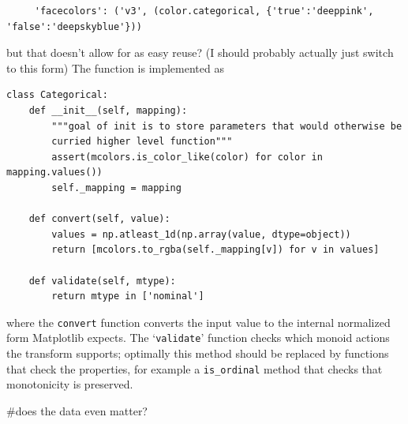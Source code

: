 \documentclass[../main.tex]{subfiles}
\begin{document}
\begin{verbatim}
     'facecolors': ('v3', (color.categorical, {'true':'deeppink', 'false':'deepskyblue'}))
\end{verbatim}

but that doesn't allow for as easy reuse? (I should probably actually just switch to this form) The  function is implemented as 
\begin{verbatim}
class Categorical:
    def __init__(self, mapping):
        """goal of init is to store parameters that would otherwise be
        curried higher level function"""
        assert(mcolors.is_color_like(color) for color in mapping.values())
        self._mapping = mapping

    def convert(self, value):
        values = np.atleast_1d(np.array(value, dtype=object))
        return [mcolors.to_rgba(self._mapping[v]) for v in values]

    def validate(self, mtype):
        return mtype in ['nominal']
\end{verbatim}

where the \texttt{convert} function converts the input value to the internal normalized form Matplotlib expects. The `\texttt{validate}' function checks which monoid actions the transform supports; optimally this method should be replaced by functions that check the properties, for example a \texttt{is_ordinal} method that checks that monotonicity is preserved. 

#does the data even matter?
\end{document}
